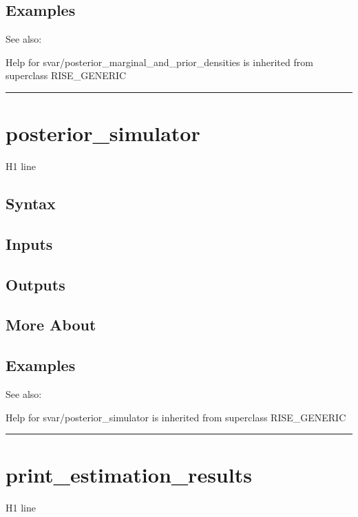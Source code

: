\documentclass[letterpaper,10pt,english]{sphinxmanual}
\begin{document}
\subsection{Examples}
\label{classes/models/@svar/svar:id89}
See also:

Help for svar/posterior\_marginal\_and\_prior\_densities is inherited from superclass RISE\_GENERIC


\bigskip\hrule{}\bigskip



\section{posterior\_simulator}
\label{classes/models/@svar/svar:id90}\label{classes/models/@svar/svar:posterior-simulator}
H1 line


\subsection{Syntax}
\label{classes/models/@svar/svar:id91}

\subsection{Inputs}
\label{classes/models/@svar/svar:id92}

\subsection{Outputs}
\label{classes/models/@svar/svar:id93}

\subsection{More About}
\label{classes/models/@svar/svar:id94}

\subsection{Examples}
\label{classes/models/@svar/svar:id95}
See also:

Help for svar/posterior\_simulator is inherited from superclass RISE\_GENERIC


\bigskip\hrule{}\bigskip



\section{print\_estimation\_results}
\label{classes/models/@svar/svar:print-estimation-results}\label{classes/models/@svar/svar:id96}
H1 line
\end{document}
